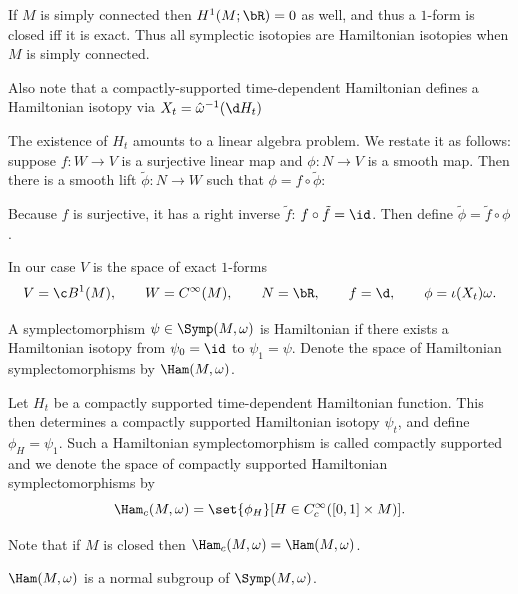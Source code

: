 \edefn

If $M$ is simply connected then $H^1(M;\bR)=0$ as well, and thus a $1$-form is closed iff it is exact.
Thus all symplectic isotopies are Hamiltonian isotopies when $M$ is simply connected.

Also note that a compactly-supported time-dependent Hamiltonian defines a Hamiltonian isotopy via $X_t=\hat\omega^{-1}(\d H_t)$

\bnote

    The existence of $H_t$ amounts to a linear algebra problem.
    We restate it as follows: suppose $f\colon W\to V$ is a surjective linear map and $\phi\colon N\to V$ is a smooth map.
    Then there is a smooth lift $\tilde\phi\colon N\to W$ such that $\phi=f\circ\tilde\phi$:


    Because $f$ is surjective, it has a right inverse $\tilde f$: $f\circ\tilde f=\id$.
    Then define $\tilde\phi=\tilde f\circ\phi$.

    In our case $V$ is the space of exact $1$-forms
    $$ V=\c B^1(M),\qquad W=C^\infty(M),\qquad N=\bR,\qquad f=\d,\qquad \phi=\iota(X_t)\omega . $$

\enote

\bdefn

    A symplectomorphism $\psi\in\Symp(M,\omega)$ is {\emphcolor Hamiltonian} if there exists a Hamiltonian isotopy from $\psi_0=\id$ to $\psi_1=\psi$.
    Denote the space of Hamiltonian symplectomorphisms by $\Ham(M,\omega)$.

    Let $H_t$ be a compactly supported time-dependent Hamiltonian function.
    This then determines a compactly supported Hamiltonian isotopy $\psi_t$, and define $\phi_H=\psi_1$.
    Such a Hamiltonian symplectomorphism is called {\emphcolor compactly supported} and we denote the space of compactly supported Hamiltonian symplectomorphisms by
    $$ \Ham_c(M,\omega) = \set{\phi_H}[{H\in C^\infty_c([0,1]\times M)}] . $$

\edefn

Note that if $M$ is closed then $\Ham_c(M,\omega)=\Ham(M,\omega)$.

\bprop

    $\Ham(M,\omega)$ is a normal subgroup of $\Symp(M,\omega)$.

